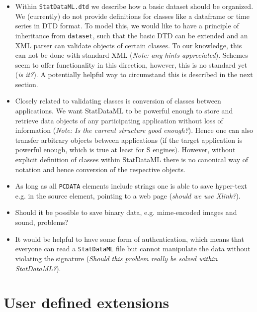 \documentclass[a4paper]{article}
\begin{document}
\begin{itemize}
 \item Within \texttt{StatDataML.dtd} we describe how a basic dataset
  should be organized. We (currently) do not provide definitions for
  classes like a dataframe or time series in DTD format.  To model
  this, we would like to have a principle of inheritance from
  \texttt{dataset}, such that the basic DTD can be extended and an XML
  parser can validate objects of certain classes.  To our knowledge,
  this can not be done with standard XML (\emph{Note: any hints
    appreciated}).  Schemes seem to offer functionality in this
  direction, however, this is no standard yet (\emph{is it?}).
  A potentially helpful way to circumstand this is described 
  in the next section. 

 \item Closely related to validating classes is conversion of classes
  between applications. We want StatDataML to be powerful enough to
  store and retrieve data objects of any participating application
  without loss of information (\emph{Note: Is the current structure
    good enough?}). Hence one can also transfer arbitrary objects
  between applications (if the target application is powerful enough,
  which is true at least for S engines). However, without explicit
  definition of classes within StatDataML there is no canonical way of
  notation and hence conversion of the respective objects.

 \item As long as all \texttt{PCDATA} elements
  include strings one is able to save hyper-text
  e.g. in the source element, pointing to a web page (\emph{should we use Xlink?}).

 \item Should it be possible to save binary data, e.g. mime-encoded images 
  and sound, problems?

 \item It would be helpful to have some form of authentication, which means
 that everyone can read a \texttt{StatDataML} file but cannot manipulate the
 data without violating the signature (\emph{Should this problem
   really be solved within StatDataML?}).     

\end{itemize}

\section{User defined extensions}
\end{document}
